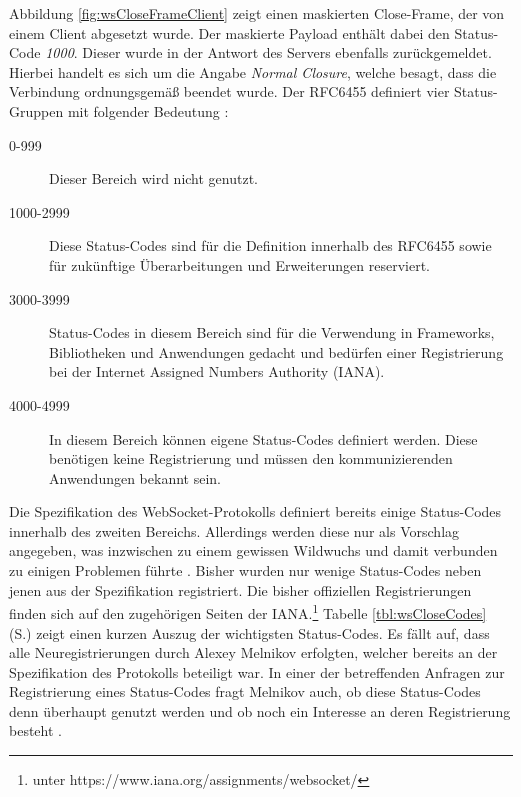 \documentclass[11pt,a4paper,titlepage]{scrartcl}
\numberwithin{equation}{section}
\begin{document}
\noindent Abbildung \ref{fig:wsCloseFrameClient} zeigt einen maskierten Close-Frame, der von einem Client abgesetzt wurde. Der maskierte Payload enthält dabei den Status-Code \textit{1000}. Dieser wurde in der Antwort des Servers ebenfalls zurückgemeldet. Hierbei handelt es sich um die Angabe \textit{Normal Closure}, welche besagt, dass die Verbindung ordnungsgemäß beendet wurde. Der RFC6455 definiert vier Status-Gruppen mit folgender Bedeutung \autocite[46]{fette_websocket_2011}:
\begin{description}
	\item[0-999] Dieser Bereich wird nicht genutzt.
	\item[1000-2999] Diese Status-Codes sind für die Definition innerhalb des RFC6455 sowie für zukünftige Überarbeitungen und Erweiterungen reserviert.
	\item[3000-3999] Status-Codes in diesem Bereich sind für die Verwendung in Frameworks, Bibliotheken und Anwendungen gedacht und bedürfen einer Registrierung bei der Internet Assigned Numbers Authority (IANA).
	\item[4000-4999] In diesem Bereich können eigene Status-Codes definiert werden. Diese benötigen keine Registrierung und müssen den kommunizierenden Anwendungen bekannt sein. 
\end{description}

\noindent Die Spezifikation des WebSocket-Protokolls definiert bereits einige Status-Codes innerhalb des zweiten Bereichs. Allerdings werden diese nur als Vorschlag angegeben, was inzwischen zu einem gewissen Wildwuchs und damit verbunden zu einigen Problemen führte \autocite[53]{gorski_websockets_2015}. Bisher wurden nur wenige Status-Codes neben jenen aus der Spezifikation registriert. Die bisher offiziellen Registrierungen finden sich auf den zugehörigen Seiten der IANA.\footnote{unter https://www.iana.org/assignments/websocket/} Tabelle \ref{tbl:wsCloseCodes} (S.\pageref{tbl:wsCloseCodes}) zeigt einen kurzen Auszug der wichtigsten Status-Codes. Es fällt auf, dass alle Neuregistrierungen durch Alexey Melnikov erfolgten, welcher bereits an der Spezifikation des Protokolls beteiligt war. In einer der betreffenden Anfragen zur Registrierung eines Status-Codes fragt Melnikov auch, ob diese Status-Codes denn überhaupt genutzt werden und ob noch ein Interesse an deren Registrierung besteht \autocite{melnikov_additional_2012}.
\end{document}

